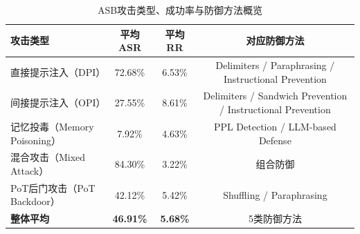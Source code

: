 \begin{table}[htbp]
\centering
\caption{ASB攻击类型、成功率与防御方法概览}
\label{tab:asb_attack_defense}
\small
\begin{tabular}{lccc}
\toprule
\textbf{攻击类型} & \textbf{平均ASR} & \textbf{平均RR} & \textbf{对应防御方法} \\
\midrule
直接提示注入（DPI） & 72.68\% & 6.53\% & Delimiters / Paraphrasing / Instructional Prevention \\
间接提示注入（OPI） & 27.55\% & 8.61\% & Delimiters / Sandwich Prevention / Instructional Prevention \\
记忆投毒（Memory Poisoning） & 7.92\% & 4.63\% & PPL Detection / LLM-based Defense \\
混合攻击（Mixed Attack） & 84.30\% & 3.22\% & 组合防御 \\
PoT后门攻击（PoT Backdoor） & 42.12\% & 5.42\% & Shuffling / Paraphrasing \\
\midrule
\textbf{整体平均} & \textbf{46.91\%} & \textbf{5.68\%} & 5类防御方法 \\
\bottomrule
\end{tabular}
\end{table}
